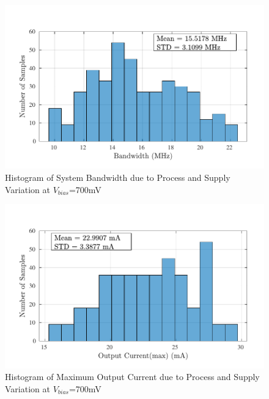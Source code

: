 \begin{figure} [H]
\centering
\includegraphics[scale=1]{Figures/Corners/Overall/PV_Max/PDFs/PV_Max_bw.pdf}
\caption{Histogram of System Bandwidth due to Process and Supply Variation at $V_{bias}$=700mV}
\end{figure}

\begin{figure} [H]
\centering
\includegraphics[scale=1]{Figures/Corners/Overall/PV_Max/PDFs/PV_Max_imax.pdf}
\caption{Histogram of Maximum Output Current due to Process and Supply Variation at $V_{bias}$=700mV}
\end{figure}


